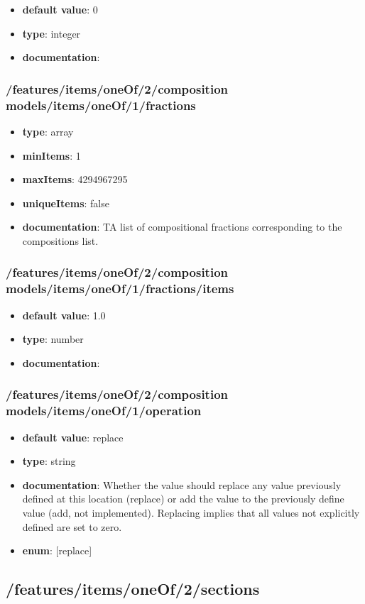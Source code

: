 \begin{itemize}\item {\bf default value}: 0
\item {\bf type}: integer
\item {\bf documentation}: 
\end{itemize}\subsubsection{/features/items/oneOf/2/composition models/items/oneOf/1/fractions}
\begin{itemize}\item {\bf type}: array
\item {\bf minItems}: 1
\item {\bf maxItems}: 4294967295
\item {\bf uniqueItems}: false
\item {\bf documentation}: TA list of compositional fractions corresponding to the compositions list.
\end{itemize}\subsubsection{/features/items/oneOf/2/composition models/items/oneOf/1/fractions/items}
\begin{itemize}\item {\bf default value}: 1.0
\item {\bf type}: number
\item {\bf documentation}: 
\end{itemize}\subsubsection{/features/items/oneOf/2/composition models/items/oneOf/1/operation}
\begin{itemize}\item {\bf default value}: replace
\item {\bf type}: string
\item {\bf documentation}: Whether the value should replace any value previously defined at this location (replace) or add the value to the previously define value (add, not implemented). Replacing implies that all values not explicitly defined are set to zero.
\item {\bf enum}: [replace]\end{itemize}\subsection{/features/items/oneOf/2/sections}

